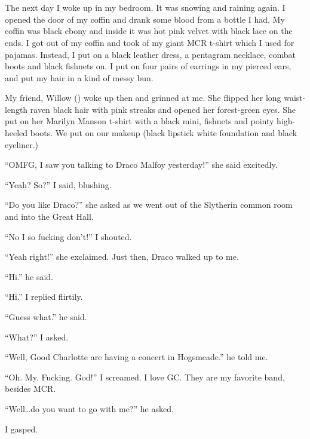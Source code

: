 \section{\chaptername~\thesection}



The next day I woke up in my bedroom. It was snowing and raining again. I opened the door of my coffin and drank some blood from a bottle I had. My coffin was black ebony and inside it was hot pink velvet with black lace on the ends. I got out of my coffin and took of my giant MCR t-shirt which I used for pajamas. Instead, I put on a black leather dress, a pentagram necklace, combat boots and black fishnets on. I put on four pairs of earrings in my pierced ears, and put my hair in a kind of messy bun.

My friend, Willow () woke up then and grinned at me. She flipped her long waist-length raven black hair with pink streaks and opened her forest-green eyes. She put on her Marilyn Manson t-shirt with a black mini, fishnets and pointy high-heeled boots. We put on our makeup (black lipstick white foundation and black eyeliner.)

\enquote{OMFG, I saw you talking to Draco Malfoy yesterday!} she said excitedly.

\enquote{Yeah? So?} I said, blushing.

\enquote{Do you like Draco?} she asked as we went out of the Slytherin common room and into the Great Hall.

\enquote{No I so fucking don't!} I shouted.

\enquote{Yeah right!} she exclaimed. Just then, Draco walked up to me.

\enquote{Hi.} he said.

\enquote{Hi.} I replied flirtily.

\enquote{Guess what.} he said.

\enquote{What?} I asked.

\enquote{Well, Good Charlotte are having a concert in Hogsmeade.} he told me.

\enquote{Oh. My. Fucking. God!} I screamed. I love GC\@. They are my favorite band, besides MCR\@.

\enquote{Well\ldots do you want to go with me?} he asked.

I gasped.

